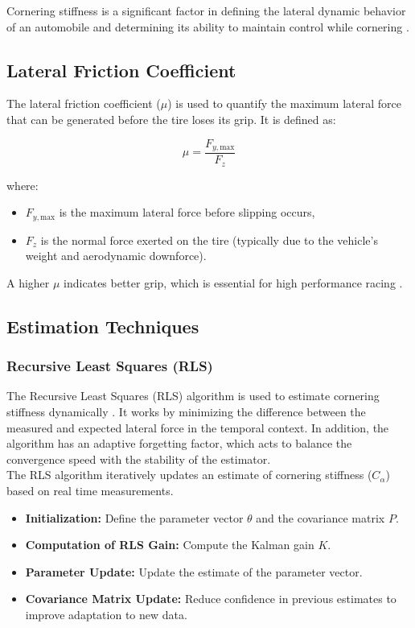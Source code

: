 \documentclass[a4paper,final,12pt]{report}
\begin{document}
Cornering stiffness is a significant factor in defining the lateral dynamic behavior of an automobile and determining its ability to maintain control while cornering \cite{Gao2012}.

\subsection{Lateral Friction Coefficient}
The lateral friction coefficient ($\mu$) is used to quantify the maximum lateral force that can be generated before the tire loses its grip. It is defined as:

\begin{equation}
\mu = \frac{F_{y,\text{max}}}{F_z}
\end{equation}

where:
\begin{itemize}
    \item $F_{y,\text{max}}$ is the maximum lateral force before slipping occurs,
    \item $F_z$ is the normal force exerted on the tire (typically due to the vehicle's weight and aerodynamic downforce).
\end{itemize}
A higher $\mu$ indicates better grip, which is essential for high performance racing \cite{Bascetta2021}.

\subsection{Estimation Techniques}
\subsubsection{Recursive Least Squares (RLS)}
The Recursive Least Squares (RLS) algorithm is used to estimate cornering stiffness dynamically \cite{Savarese2017}. It works by minimizing the difference between the measured and expected lateral force in the temporal context. In addition, the algorithm has an adaptive forgetting factor, which acts to balance the convergence speed with the stability of the estimator.\\
The RLS algorithm iteratively updates an estimate of cornering stiffness ($C_\alpha$) based on real time measurements.

\begin{itemize}
    \item \textbf{Initialization:} Define the parameter vector $\theta$ and the covariance matrix $P$.
    \item \textbf{Computation of RLS Gain:} Compute the Kalman gain $K$.
    \item \textbf{Parameter Update:} Update the estimate of the parameter vector.
    \item \textbf{Covariance Matrix Update:} Reduce confidence in previous estimates to improve adaptation to new data.
\end{itemize}
\end{document}
